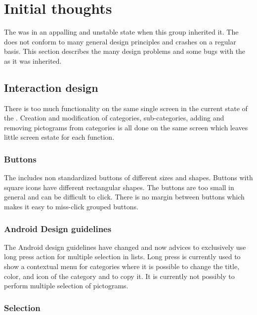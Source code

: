 \section{Initial thoughts}

The \ct was in an appalling and unstable state when this group inherited it. The \ct does not conform to many general design principles and crashes on a regular basis. This section describes the many design problems and some bugs with the \ct as it was inherited.


\subsection{Interaction design}

There is too much functionality on the same single screen in the current state of the \ct. Creation and modification of categories, sub-categories, adding and removing pictograms from categories is all done on the same screen which leaves little screen estate for each function.  

\subsubsection{Buttons}

The \ct includes non standardized buttons of different sizes and shapes. Buttons with square icons have different rectangular shapes. The buttons are too small in general and can be difficult to click. There is no margin between buttons which makes it easy to miss-click grouped buttons.   




\subsubsection{Android Design guidelines}

The Android design guidelines have changed and now advices to exclusively use long press action for multiple selection in lists. Long press is currently used to show a contextual menu for categories where it is possible to change the title, color, and icon of the category and to copy it. It is currently not possibly to perform multiple selection of pictograms. 

\subsubsection{Selection}

